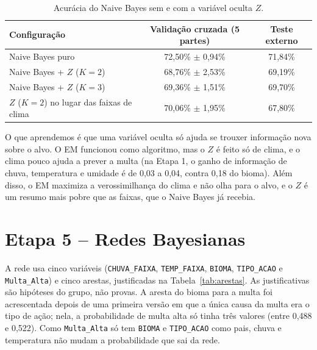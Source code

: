 \documentclass[11pt]{article}
\begin{document}
\begin{table}[H]
\centering
\small
\begin{tabular}{lcc}
\toprule
Configuração & Validação cruzada (5 partes) & Teste externo \\
\midrule
Naive Bayes puro & 72,50\% $\pm$ 0,94\% & 71,84\% \\
Naive Bayes + $Z$ ($K=2$) & 68,76\% $\pm$ 2,53\% & 69,19\% \\
Naive Bayes + $Z$ ($K=3$) & 69,36\% $\pm$ 1,51\% & 69,70\% \\
$Z$ ($K=2$) no lugar das faixas de clima & 70,06\% $\pm$ 1,95\% & 67,80\% \\
\bottomrule
\end{tabular}
\caption{Acurácia do Naive Bayes sem e com a variável oculta $Z$.}
\label{tab:nb_em}
\end{table}

O que aprendemos é que uma variável oculta só ajuda se trouxer informação nova sobre o alvo. O EM funcionou como algoritmo, mas o $Z$ é feito só de clima, e o clima pouco ajuda a prever a multa (na Etapa 1, o ganho de informação de chuva, temperatura e umidade é de 0,03 a 0,04, contra 0,18 do bioma). Além disso, o EM maximiza a verossimilhança do clima e não olha para o alvo, e o $Z$ é um resumo mais pobre que as faixas, que o Naive Bayes já recebia.

\section{Etapa 5 -- Redes Bayesianas}
A rede usa cinco variáveis (\texttt{CHUVA\_FAIXA}, \texttt{TEMP\_FAIXA}, \texttt{BIOMA}, \texttt{TIPO\_ACAO} e \texttt{Multa\_Alta}) e cinco arestas, justificadas na Tabela~\ref{tab:arestas}. As justificativas são hipóteses do grupo, não provas. A aresta do bioma para a multa foi acrescentada depois de uma primeira versão em que a única causa da multa era o tipo de ação; nela, a probabilidade de multa alta só tinha três valores (entre 0,488 e 0,522). Como \texttt{Multa\_Alta} só tem \texttt{BIOMA} e \texttt{TIPO\_ACAO} como pais, chuva e temperatura não mudam a probabilidade que sai da rede.
\end{document}

